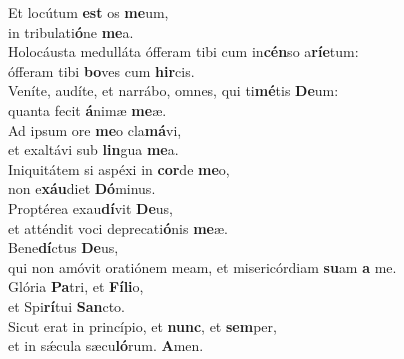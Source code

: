 \oddverse Et locútum \textbf{est} os \textbf{me}um,~\*\\
\oddverse in tribulati\textbf{ó}ne \textbf{me}a.\\
\evenverse Holocáusta medulláta ófferam tibi cum in\textbf{cén}so a\textbf{rí}\textbf{e}tum:~\*\\
\evenverse ófferam tibi \textbf{bo}ves cum \textbf{hir}cis.\\
\oddverse Veníte, audíte, et narrábo, omnes, qui ti\textbf{mé}tis \textbf{De}um:~\*\\
\oddverse quanta fecit \textbf{á}nimæ \textbf{me}æ.\\
\evenverse Ad ipsum ore \textbf{me}o cla\textbf{má}vi,~\*\\
\evenverse et exaltávi sub \textbf{lin}gua \textbf{me}a.\\
\oddverse Iniquitátem si aspéxi in \textbf{cor}de \textbf{me}o,~\*\\
\oddverse non e\textbf{xáu}diet \textbf{Dó}minus.\\
\evenverse Proptérea exau\textbf{dí}vit \textbf{De}us,~\*\\
\evenverse et atténdit voci deprecati\textbf{ó}nis \textbf{me}æ.\\
\oddverse Bene\textbf{dí}ctus \textbf{De}us,~\*\\
\oddverse qui non amóvit oratiónem meam, et misericórdiam \textbf{su}am \textbf{a} me.\\
\evenverse Glória \textbf{Pa}tri, et \textbf{Fí}\textbf{li}o,~\*\\
\evenverse et Spi\textbf{rí}tui \textbf{San}cto.\\
\oddverse Sicut erat in princípio, et \textbf{nunc}, et \textbf{sem}per,~\*\\
\oddverse et in sǽcula sæcu\textbf{ló}rum. \textbf{A}men.\\
